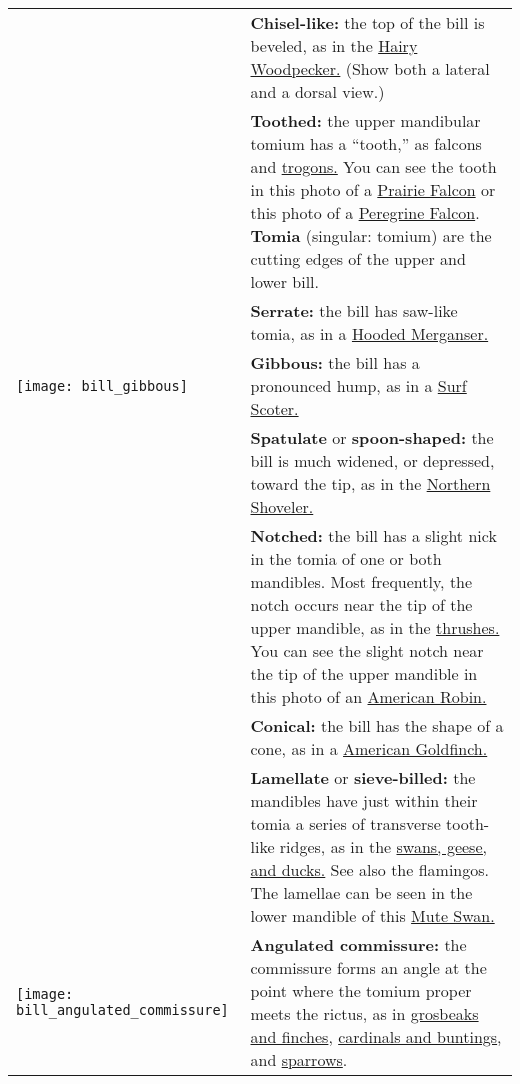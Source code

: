 \documentclass[10pt]{article}
\begin{document}
\begin{longtable}{@{}C{0.45\textwidth}L{0.45\textwidth}@{}}
%
& \textbf{Chisel-like:} the top of the bill is beveled, as in the \href{https://www.allaboutbirds.org/guide/Hairy_Woodpecker}{Hairy Woodpecker.} (Show both a lateral and a dorsal view.)\\ [2.5cm]
%
& \textbf{Toothed:} the upper mandibular tomium has a “tooth,” as falcons and \href{https://www.allaboutbirds.org/guide/Elegant_Trogon}{trogons.} You can see the tooth in this photo of a \href{https://macaulaylibrary.org/asset/273577511}{Prairie Falcon} or this photo of a \href{https://macaulaylibrary.org/asset/296208031}{Peregrine Falcon}. \textbf{Tomia} (singular: tomium) are the cutting edges of the upper and lower bill.\\ [2.5cm]
%
& \textbf{Serrate:} the bill has saw-like tomia, as in a \href{https://www.allaboutbirds.org/guide/Hooded_Merganser}{Hooded Merganser.} \\ [2.5cm]
%
\texttt{[image: bill\_gibbous]}& \textbf{Gibbous:} the bill has a pronounced hump, as in a \href{https://www.allaboutbirds.org/guide/Surf_Scoter}{Surf Scoter.}\\ [2.5cm]
%
& \textbf{Spatulate} or \textbf{spoon-shaped:} the bill is much widened, or depressed, toward the tip, as in the \href{https://www.allaboutbirds.org/guide/Northern_Shoveler}{Northern Shoveler.}\\ [2.5cm]
%
& \textbf{Notched:} the bill has a slight nick in the tomia of one or both mandibles. Most frequently, the notch occurs near the tip of the upper mandible, as in the \href{https://www.allaboutbirds.org/guide/browse/taxonomy/Turdidae}{thrushes.} You can see the slight notch near the tip of the upper mandible in this photo of an \href{https://macaulaylibrary.org/asset/290023681}{American Robin.}\\ [2.5cm]
%
& \textbf{Conical:} the bill has the shape of a cone, as in a \href{https://www.allaboutbirds.org/guide/American_Goldfinch}{American Goldfinch.} \\ [2.5cm]
%
& \textbf{Lamellate} or \textbf{sieve-billed:} the mandibles have just within their tomia a series of transverse tooth-like ridges, as in the \href{https://www.allaboutbirds.org/guide/browse/taxonomy/Anatidae}{swans, geese, and ducks.} See also the flamingos. The lamellae can be seen in the lower mandible of this \href{https://macaulaylibrary.org/asset/162682211}{Mute Swan.}\\ [2.5cm]
%
\texttt{[image: bill\_angulated\_commissure]}& \textbf{Angulated commissure:} the commissure forms an angle at the point where the tomium proper meets the rictus, as in \href{https://www.allaboutbirds.org/guide/browse/taxonomy/Fringillidae}{grosbeaks and finches}, \href{https://www.allaboutbirds.org/guide/browse/taxonomy/Cardinalidae}{cardinals and buntings}, and \href{https://www.allaboutbirds.org/guide/browse/taxonomy/Passerellidae}{sparrows}. \smallskip 


\end{longtable}
\end{document}
